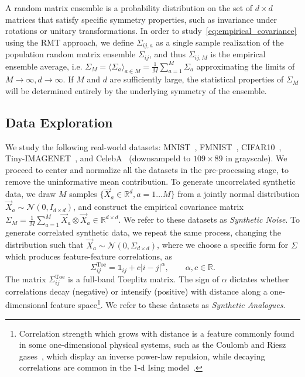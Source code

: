 \documentclass{article}
\begin{document}
A random matrix ensemble is a probability distribution on the set of $d\times d$ matrices that satisfy specific symmetry properties, such as invariance under rotations or unitary transformations.
In order to study~\cref{eq:empirical_covariance} using the RMT approach,  we define $\Sigma_{ij,a}$ as a single sample realization of the population random matrix ensemble $\Sigma_{ij}$, and thus $\Sigma_{ij,M}$ is the empirical ensemble average, i.e. $\Sigma_M = \langle \Sigma_a \rangle_{a\in M} =  \tfrac{1}{M}\sum_{a=1}^M\Sigma_a$ approximating the limits of $M \to \infty, d\to \infty$. If $M$ and $d$ are sufficiently large, the statistical properties of $\Sigma_M$ will be determined entirely by the underlying symmetry of the ensemble.

\subsection{Data Exploration}
\label{exp}



We study the following real-world datasets:
MNIST~\cite{mnist}, FMNIST~\cite{fmnist}, CIFAR10~\cite{cifar10}, Tiny-IMAGENET~\cite{tinyimagenet}, and CelebA~\cite{celeba} (downsampeld to $109\times89$ in grayscale).
We proceed to center and normalize all the datasets in the pre-processing stage, to remove the uninformative mean contribution.
To generate uncorrelated synthetic data, we draw $M$ samples $\{\vec{X}_a \in \mathbb{R}^{d}, a =1 \ldots M \}$ from a jointly normal distribution $\vec{X}_a\sim\mathcal{N}(0, I_{d\times d})$, and construct the empirical covariance matrix $\Sigma_M = \tfrac{1}{M} \sum_{a=1}^M \vec{X}_a \otimes  \vec{X}_a \in \mathbb{R}^{d\times d}$. We refer to these datasets as {\it Synthetic Noise}. To generate correlated synthetic data, we repeat the same process, changing the distribution such that $\vec{X}_a\sim \mathcal{N}(0, \Sigma_{d\times d})$, where we choose a specific form for $\Sigma$ which produces feature-feature correlations, as
\begin{equation}
\label{eq:toeplitz}
    \Sigma_{ij}^\mathrm{Toe} = \mathbb{1}_{ij} + c |i-j|^\alpha,
    \qquad \alpha,c \in \mathbb{R}.
\end{equation}
The matrix $\Sigma_{ij}^\mathrm{Toe}$ is a full-band Toeplitz matrix. The sign of $\alpha$ dictates whether correlations decay (negative) or intensify (positive) with distance along a one-dimensional feature space\footnote{Correlation strength which grows with distance is a feature commonly found in some one-dimensional physical systems, such as the Coulomb and Riesz gases~\cite{Coulomb,Riesz}, which display an inverse power-law repulsion, while decaying correlations are common in the 1-d Ising model~\cite{ising}. }.
 We refer to these datasets as {\it Synthetic Analogues}.
\end{document}
